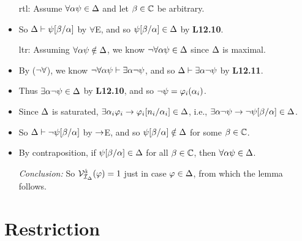 \documentclass[a4paper, 11pt]{article} %
\begin{document}
\begin{itemize}
    \item[\sc rtl:] Assume $\forall \alpha\psi \in \Delta$ and let $\beta \in \mathbb{C}$ be arbitrary.
    \item So $\Delta \vdash \psi[\beta/\alpha]$ by $\forall$E, and so $\psi[\beta/\alpha] \in \Delta$ by \textbf{L12.10}. 
    \item[\sc ltr:] Assuming $\forall \alpha\psi \notin \Delta$, we know $\neg\forall \alpha\psi \in \Delta$ since $\Delta$ is maximal.
    \item By ($\neg\forall$), we know $\neg\forall \alpha\psi \vdash \exists \alpha\neg\psi$, and so $\Delta \vdash \exists \alpha\neg\psi$ by \textbf{L12.11}.
    \item Thus $\exists \alpha\neg\psi \in \Delta$ by \textbf{L12.10}, and so $\neg\psi=\varphi_i(\alpha_i)$.
    \item Since $\Delta$ is saturated, $\exists \alpha_i \varphi_i \rightarrow \varphi_i[n_i/\alpha_i] \in \Delta$, i.e., $\exists \alpha\neg\psi \rightarrow \neg\psi[\beta/\alpha] \in  \Delta$.
    \item So $\Delta \vdash \neg\psi[\beta/\alpha]$ by $\rightarrow$E, and so $\psi[\beta/\alpha] \notin \Delta$ for some $\beta \in \mathbb{C}$.
    \item By contraposition, if $\psi[\beta/\alpha] \in \Delta$ for all $\beta \in \mathbb{C}$, then $\forall \alpha\psi \in \Delta$.
  \item[\it Conclusion:] So $\mathcal{V}_{\mathcal{I}_{\Delta}}^{\hat{a}}(\varphi)=1$ just in case $\varphi\in\Delta$, from which the lemma follows.
\end{itemize}





\section*{Restriction}
\end{document}
